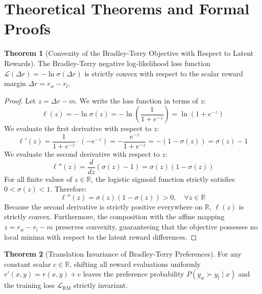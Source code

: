 \documentclass[11pt,a4paper]{article}
\theoremstyle{definition}
\newtheorem{theorem}{\textbf{Theorem}}[section]
\begin{document}
\section{Theoretical Theorems and Formal Proofs}

\begin{theorem}[Convexity of the Bradley-Terry Objective with Respect to Latent Rewards]
The Bradley-Terry negative log-likelihood loss function $\mathcal{L}(\Delta r) = -\ln \sigma(\Delta r)$ is strictly convex with respect to the scalar reward margin $\Delta r = r_w - r_l$.
\end{theorem}

\begin{proof}
Let $z = \Delta r - m$. We write the loss function in terms of $z$:
{\boldmath
\begin{equation}
\ell(z) = -\ln \sigma(z) = -\ln \left( \frac{1}{1 + e^{-z}} \right) = \ln(1 + e^{-z})
\end{equation}
}
We evaluate the first derivative with respect to $z$:
{\boldmath
\begin{equation}
\ell'(z) = \frac{1}{1 + e^{-z}} \cdot (-e^{-z}) = -\frac{e^{-z}}{1 + e^{-z}} = -(1 - \sigma(z)) = \sigma(z) - 1
\end{equation}
}
We evaluate the second derivative with respect to $z$:
{\boldmath
\begin{equation}
\ell''(z) = \frac{d}{dz} (\sigma(z) - 1) = \sigma(z)(1 - \sigma(z))
\end{equation}
}
For all finite values of $z \in \mathbb{R}$, the logistic sigmoid function strictly satisfies $0 < \sigma(z) < 1$.
Therefore:
{\boldmath
\begin{equation}
\ell''(z) = \sigma(z)(1 - \sigma(z)) > 0, \quad \forall z \in \mathbb{R}
\end{equation}
}
Because the second derivative is strictly positive everywhere on $\mathbb{R}$, $\ell(z)$ is strictly convex.
Furthermore, the composition with the affine mapping $z = r_w - r_l - m$ preserves convexity, guaranteeing that the objective possesses no local minima with respect to the latent reward differences.
\end{proof}

\begin{theorem}[Translation Invariance of Bradley-Terry Preferences]
For any constant scalar $c \in \mathbb{R}$, shifting all reward evaluations uniformly $r'(x, y) = r(x, y) + c$ leaves the preference probability $P(y_w \succ y_l \mid x)$ and the training loss $\mathcal{L}_{\text{RM}}$ strictly invariant.
\end{theorem}
\end{document}
